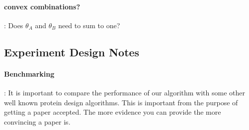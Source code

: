 \documentclass{article}
\begin{document}
\paragraph{convex combinations?} : Does $\theta_A$ and $\theta_B$ need to sum to one?

\subsection{Experiment Design Notes}

\paragraph{Benchmarking} : It is important to compare the performance of our algorithm with some other well known protein design algorithms. This is important from the purpose of getting a paper accepted. The more evidence you can provide the more convincing a paper is. 
\end{document}
